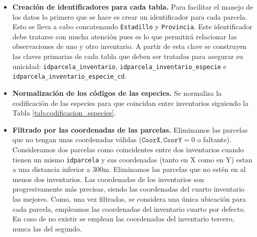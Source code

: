 \begin{itemize}
    \item \textbf{Creación de identificadores para cada tabla.} Para facilitar el manejo de los datos lo primero que se hace es crear un identificador para cada parcela. Esto se lleva a cabo concatenando \texttt{Estadillo} y \texttt{Provincia}. Este identificador debe tratarse con mucha atención pues es lo que permitirá relacionar las observaciones de uno y otro inventario. A partir de esta clave se construyen las claves primarias de cada tabla que deben ser tratadas para asegurar su unicidad: \texttt{idparcela\_inventario}, \texttt{idparcela\_inventario\_especie} e \texttt{idparcela\_inventario\_especie\_cd}.
    
    \medskip
    
    \item \textbf{Normalización de los códigos de las especies.} Se normaliza la codificación de las especies para que coincidan entre inventarios siguiendo la Tabla \ref{tab:codificacion_especies}. 

    
    \medskip

    \item \textbf{Filtrado por las coordenadas de las parcelas. } Eliminamos las parcelas que no tengan unas coordenadas válidas ($\texttt{CoorX}, \texttt{CoorY} =0$ o faltante). Consideramos dos parcelas como coincidentes entre dos inventarios cuando  tienen un mismo \texttt{idparcela} y sus coordenadas (tanto en X como en Y) estan a una distancia inferior a $300$m. Eliminamos las parcelas que no estén en al menos dos inventarios. Las coordenadas de los inventarios son progresivamente más precisas, siendo las coordenadas del cuarto inventario las mejores. Como, una vez filtradas, se considera una única ubicación para cada parcela, empleamos las coordenadas del inventario cuarto por defecto. En caso de no existir se emplean las coordenadas del inventario tercero, nunca las del segundo. 

    \medskip
    

\end{itemize}

